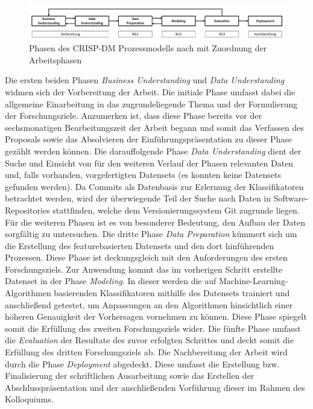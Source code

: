 \begin{figure}[H]
    \centering
    \includegraphics[width=\textwidth]{images/CRISP-DM}
    \caption{Phasen des CRISP-DM Prozessmodells nach \cite{Chapman2000} mit Zuordnung der Arbeitsphasen}\label{fig:crisp}
\end{figure}

Die ersten beiden Phasen \emph{Business Understanding} und \emph{Data Understanding} widmen sich der Vorbereitung der Arbeit. Die initiale Phase umfasst dabei die allgemeine Einarbeitung in das zugrundeliegende Thema und der Formulierung der Forschungsziele. Anzumerken ist, dass diese Phase bereits vor der sechsmonatigen Bearbeitungszeit der Arbeit begann und somit das Verfassen des Proposals sowie das Absolvieren der Einführungspräsentation zu dieser Phase gezählt werden können. Die darauffolgende Phase \emph{Data Understanding} dient der Suche und Einsicht von für den weiteren Verlauf der Phasen relevanten Daten und, falls vorhanden, vorgefertigten Datensets (es konnten keine Datensets gefunden werden). Da Commits als Datenbasis zur Erlernung der Klassifikatoren betrachtet werden, wird der überwiegende Teil der Suche nach Daten in Software-Repositories stattfinden, welche dem Versionierungssystem Git zugrunde liegen. Für die weiteren Phasen ist es von besonderer Bedeutung, den Aufbau der Daten sorgfältig zu untersuchen. Die dritte Phase \emph{Data Preparation} kümmert sich um die Erstellung des featurebasierten Datensets und den dort hinführenden Prozessen. Diese Phase ist deckungsgleich mit den Anforderungen des ersten Forschungsziels. Zur Anwendung kommt das im vorherigen Schritt erstellte Datenset in der Phase \emph{Modeling}. In dieser werden die auf Machine-Learning-Algorithmen basierenden Klassifikatoren mithilfe des Datensets trainiert und anschließend getestet, um Anpassungen an den Algorithmen hinsichtlich einer höheren Genauigkeit der Vorhersagen vornehmen zu können. Diese Phase spiegelt somit die Erfüllung des zweiten Forschungsziels wider. Die fünfte Phase umfasst die \emph{Evaluation} der Resultate des zuvor erfolgten Schrittes und deckt somit die Erfüllung des dritten Forschungsziels ab. Die Nachbereitung der Arbeit wird durch die Phase \emph{Deployment} abgedeckt. Diese umfasst die Erstellung bzw. Finalisierung der schriftlichen Ausarbeitung sowie das Erstellen der Abschlusspräsentation und der anschließenden Vorführung dieser im Rahmen des Kolloquiums.

